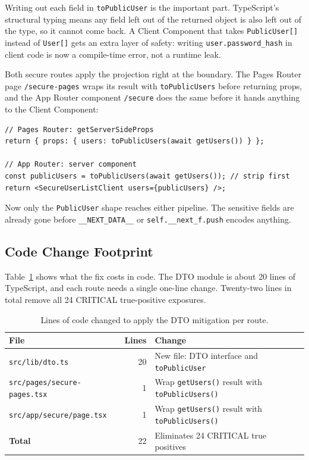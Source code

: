 \documentclass[runningheads]{llncs}
\begin{document}
Writing out each field in \texttt{toPublicUser} is the important part.
TypeScript's structural typing means any field left out of the returned
object is also left out of the type, so it cannot come back.  A Client
Component that takes \texttt{PublicUser[]} instead of \texttt{User[]} gets
an extra layer of safety: writing \texttt{user.password\_hash} in client
code is now a compile-time error, not a runtime leak.

Both secure routes apply the projection right at the boundary.  The Pages
Router page \texttt{/secure-pages} wraps its result with
\texttt{toPublicUsers} before returning props, and the App Router
component \texttt{/secure} does the same before it hands anything to the
Client Component:

\begin{lstlisting}[style=typescript, caption={DTO applied at both
  serialization boundaries.}, label={lst:secure}]
// Pages Router: getServerSideProps
return { props: { users: toPublicUsers(await getUsers()) } };

// App Router: server component
const publicUsers = toPublicUsers(await getUsers()); // strip first
return <SecureUserListClient users={publicUsers} />;
\end{lstlisting}

Now only the \texttt{PublicUser} shape reaches either pipeline.  The
sensitive fields are already gone before \texttt{\_\_NEXT\_DATA\_\_} or
\texttt{self.\_\_next\_f.push} encodes anything.

\subsection{Code Change Footprint}

Table~\ref{tab:changefootprint} shows what the fix costs in code.  The DTO
module is about 20 lines of TypeScript, and each route needs a single
one-line change.  Twenty-two lines in total remove all 24 CRITICAL
true-positive exposures.

\begin{table}[tbp]
  \caption{Lines of code changed to apply the DTO mitigation per route.}
  \label{tab:changefootprint}
  \centering
  \begin{tabular}{lrl}
    \toprule
    \textbf{File} & \textbf{Lines} & \textbf{Change} \\
    \midrule
    \texttt{src/lib/dto.ts}               & 20 & New file: DTO interface and \texttt{toPublicUser} \\
    \texttt{src/pages/secure-pages.tsx}   & 1  & Wrap \texttt{getUsers()} result with \texttt{toPublicUsers()} \\
    \texttt{src/app/secure/page.tsx}      & 1  & Wrap \texttt{getUsers()} result with \texttt{toPublicUsers()} \\
    \midrule
    \textbf{Total}                        & 22 & Eliminates 24 CRITICAL true positives \\
    \bottomrule
  \end{tabular}
\end{table}
\end{document}
